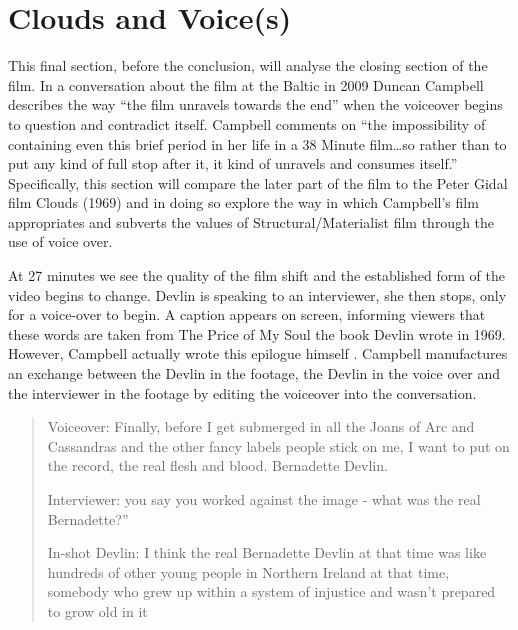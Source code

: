 \documentclass[12pt]{article}
\begin{document}
\section{Clouds and Voice(s) }

This final section, before the conclusion, will analyse the closing section of the film. In a conversation about the film at the Baltic in 2009 Duncan Campbell describes the way ``the film unravels towards the end'' when the voiceover begins to question and contradict itself. Campbell comments on ``the impossibility of containing even this brief period in her life in a 38 Minute film\dots  so rather than to put any kind of full stop after it, it kind of unravels and consumes itself.''  Specifically, this section will compare the later part of the film to the Peter Gidal film Clouds (1969) and in doing so explore the way in which Campbell's film appropriates and subverts the values of Structural/Materialist film through the use of voice over. 

At 27 minutes we see the quality of the film shift and the established form of the video begins to change. Devlin is speaking to an interviewer, she then stops, only for a voice-over to begin. A caption appears on screen, informing viewers that these words are taken from The Price of My Soul the book Devlin wrote in 1969. However, Campbell actually wrote this epilogue himself \cite{ORoirdan:2014aa}. Campbell manufactures an exchange between the Devlin in the footage, the Devlin in the voice over and the interviewer in the footage by editing the voiceover into the conversation. 
\begin{quote}
Voiceover: Finally, before I get submerged in all the Joans of Arc and Cassandras and the other fancy labels people stick on me, I want to put on the record, the real flesh and blood. Bernadette Devlin.

Interviewer: you say you worked against the image - what was the real Bernadette?''

In-shot Devlin: I think the real Bernadette Devlin at that time was like hundreds of other young people in Northern Ireland at that time, somebody who grew up within a system of injustice and wasn't prepared to grow old in it 
\end{quote}
\end{document}
